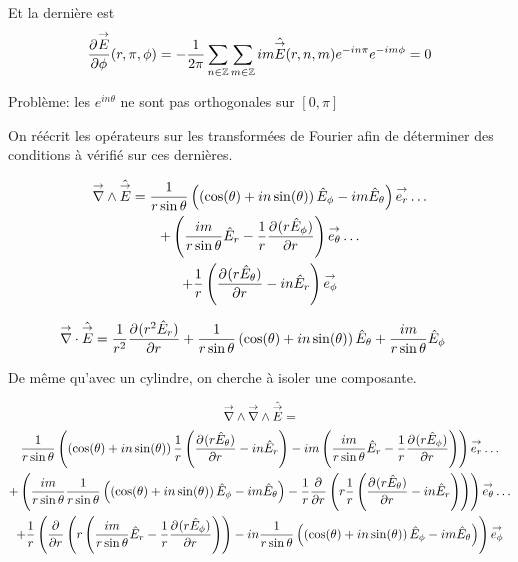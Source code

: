     Et la dernière est
    \begin{equation}
        \ds\ddr{\phi}{\vE}(r,\pi,\phi) = -\frac{1}{2\pi}\sum_{n\in\ZZ}\sum_{m\in\ZZ} im\hat{\vE}(r,n,m) e^{-in\pi}e^{-im\phi}= 0
    \end{equation}

    \begin{TODO}
        Problème: les \(e^{in\theta}\) ne sont pas orthogonales sur \([0,\pi]\)
    \end{TODO}

    On réécrit les opérateurs sur les transformées de Fourier afin de déterminer des conditions à vérifié sur ces dernières.

    \begin{multline}
        \vrot \hat{\vE} = \frac{1}{r\sin\theta}\left(\left(\cos(\theta) + in\sin(\theta)\right)\hat{E}_\phi - im \hat{E}_\theta\right)\vect{e_r}\dots
        \\
        + \left(\frac{im}{r\sin\theta}\hat{E}_r - \frac{1}{r}\ddr{r}{(r\hat{E}_\phi)} \right)\vect{e_\theta} \dots
        \\
        + \frac{1}{r}\left(\ddr{r}{(r\hat{E}_\theta)}-in\hat{E}_r\right)\vect{e_\phi}
    \end{multline}

    \begin{align}
        \vdiv \hat{\vE} &= \frac{1}{r^2}\ddr{r}{(r^2\hat{E}_r)}
        + \frac{1}{r\sin\theta}\left(\cos(\theta) + in\sin(\theta)\right)\hat{E}_\theta + \frac{im}{r\sin\theta}{\hat{E}_\phi}
    \end{align}

    De même qu'avec un cylindre, on cherche à isoler une composante.

    \begin{multline}
        \vrot \vrot \hat{\vE} = \\
        \frac{1}{r\sin\theta}\left(\left(\cos(\theta) + in\sin(\theta)\right)\frac{1}{r}\left(\ddr{r}{(r\hat{E}_\theta)}-in\hat{E}_r\right) - im \left(\frac{im}{r\sin\theta}\hat{E}_r - \frac{1}{r}\ddr{r}{(r\hat{E}_\phi)} \right)\right)\vect{e_r}\dots
        \\
        + \left(\frac{im}{r\sin\theta}\frac{1}{r\sin\theta}\left(\left(\cos(\theta) + in\sin(\theta)\right)\hat{E}_\phi - im \hat{E}_\theta\right) - \frac{1}{r}\ddr{r}{}\left(r \frac{1}{r}\left(\ddr{r}{(r\hat{E}_\theta)}-in\hat{E}_r\right)\right) \right)\vect{e_\theta} \dots
        \\
        + \frac{1}{r}\left(\ddr{r}{}\left(r \left(\frac{im}{r\sin\theta}\hat{E}_r - \frac{1}{r}\ddr{r}{(r\hat{E}_\phi)} \right)\right)-in\frac{1}{r\sin\theta}\left(\left(\cos(\theta) + in\sin(\theta)\right)\hat{E}_\phi - im \hat{E}_\theta\right)\right)\vect{e_\phi}
    \end{multline}

